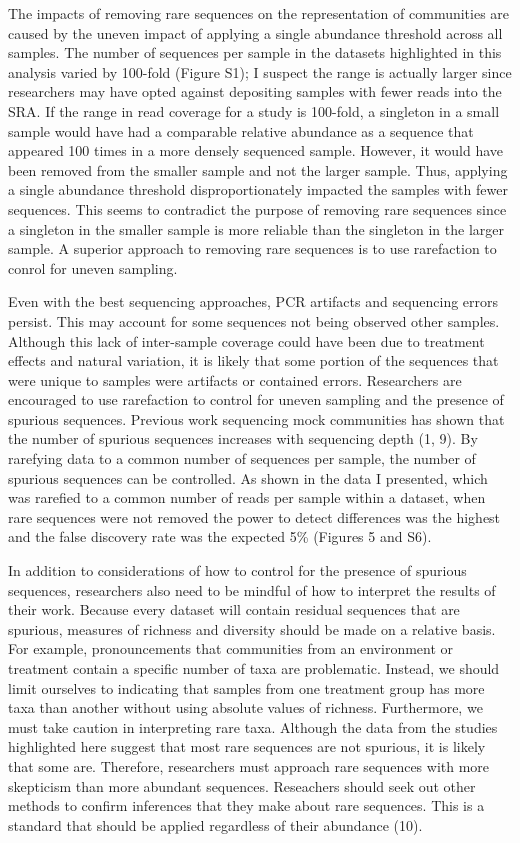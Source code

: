 \documentclass[
]{article}
\begin{document}
The impacts of removing rare sequences on the representation of
communities are caused by the uneven impact of applying a single
abundance threshold across all samples. The number of sequences per
sample in the datasets highlighted in this analysis varied by 100-fold
(Figure S1); I suspect the range is actually larger since researchers
may have opted against depositing samples with fewer reads into the SRA.
If the range in read coverage for a study is 100-fold, a singleton in a
small sample would have had a comparable relative abundance as a
sequence that appeared 100 times in a more densely sequenced sample.
However, it would have been removed from the smaller sample and not the
larger sample. Thus, applying a single abundance threshold
disproportionately impacted the samples with fewer sequences. This seems
to contradict the purpose of removing rare sequences since a singleton
in the smaller sample is more reliable than the singleton in the larger
sample. A superior approach to removing rare sequences is to use
rarefaction to conrol for uneven sampling.

Even with the best sequencing approaches, PCR artifacts and sequencing
errors persist. This may account for some sequences not being observed
other samples. Although this lack of inter-sample coverage could have
been due to treatment effects and natural variation, it is likely that
some portion of the sequences that were unique to samples were artifacts
or contained errors. Researchers are encouraged to use rarefaction to
control for uneven sampling and the presence of spurious sequences.
Previous work sequencing mock communities has shown that the number of
spurious sequences increases with sequencing depth (1, 9). By rarefying
data to a common number of sequences per sample, the number of spurious
sequences can be controlled. As shown in the data I presented, which was
rarefied to a common number of reads per sample within a dataset, when
rare sequences were not removed the power to detect differences was the
highest and the false discovery rate was the expected 5\% (Figures 5 and
S6).

In addition to considerations of how to control for the presence of
spurious sequences, researchers also need to be mindful of how to
interpret the results of their work. Because every dataset will contain
residual sequences that are spurious, measures of richness and diversity
should be made on a relative basis. For example, pronouncements that
communities from an environment or treatment contain a specific number
of taxa are problematic. Instead, we should limit ourselves to
indicating that samples from one treatment group has more taxa than
another without using absolute values of richness. Furthermore, we must
take caution in interpreting rare taxa. Although the data from the
studies highlighted here suggest that most rare sequences are not
spurious, it is likely that some are. Therefore, researchers must
approach rare sequences with more skepticism than more abundant
sequences. Reseachers should seek out other methods to confirm
inferences that they make about rare sequences. This is a standard that
should be applied regardless of their abundance (10).
\end{document}
